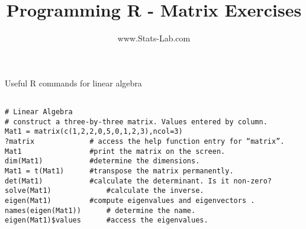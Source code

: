 \documentclass[12pt]{article}
\title{Programming R - Matrix Exercises}
\author{www.Stats-Lab.com}
\begin{document}
\maketitle

Useful R commands for linear algebra
\begin{verbatim}

# Linear Algebra
# construct a three-by-three matrix. Values entered by column.
Mat1 = matrix(c(1,2,2,0,5,0,1,2,3),ncol=3)
?matrix				# access the help function entry for “matrix”.
Mat1				#print the matrix on the screen.
dim(Mat1)			#determine the dimensions.
Mat1 = t(Mat1) 		#transpose the matrix permanently.
det(Mat1)			#calculate the determinant. Is it non-zero?
solve(Mat1) 			#calculate the inverse.
eigen(Mat1)			#compute eigenvalues and eigenvectors .
names(eigen(Mat1))		# determine the name.
eigen(Mat1)$values 		#access the eigenvalues.
\end{verbatim}
\end{document}
